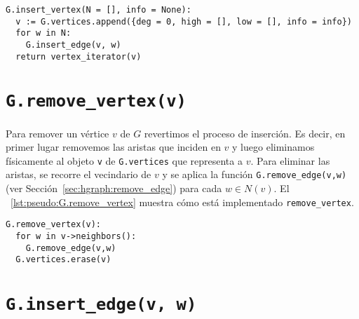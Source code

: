 \documentclass[%
    a4paper,%
    fontsize=12pt,%
    DIV=12,
    twoside,%
    openright,%
    titlepage=true,%
    headsepline,%
    toc=bibliography,%
    parskip=half,%
    cleardoublepage=empty,%
    headings=big,%
]{scrbook}
\makeatletter
\newcommand{\Code}[2][]{\lstinline[basicstyle={\ttfamily},#1]@#2@}
\makeatother
\begin{document}
\begin{lstlisting}[caption={Implementación de \Code{insert_vertex}.},float=ht,label={lst:pseudo:G.insert_vertex}]
G.insert_vertex(N = [], info = None):
  v := G.vertices.append({deg = 0, high = [], low = [], info = info})
  for w in N:
    G.insert_edge(v, w)
  return vertex_iterator(v)
\end{lstlisting}

\section{\texorpdfstring{\Code{G.remove_vertex(v)}}{G.remove\_vertex(v)}}
\label{sec:hgraph:remove_vertex}

Para remover un vértice $v$ de $G$ revertimos el proceso de inserción.  Es decir, en primer lugar removemos las aristas que inciden en $v$ y luego eliminamos físicamente al objeto \Code{v} de \Code{G.vertices} que representa a $v$.  Para eliminar las aristas, se recorre el vecindario de $v$ y se aplica la función \Code{G.remove_edge(v,w)} (ver Sección~\ref{sec:hgraph:remove_edge}) para cada $w \in N(v)$.  El \lstlistingname~\ref{lst:pseudo:G.remove_vertex} muestra cómo está implementado \Code{remove_vertex}.

\begin{lstlisting}[caption={Implementación de \Code{remove_vertex}.},float=ht,label={lst:pseudo:G.remove_vertex}]
G.remove_vertex(v):
  for w in v->neighbors():
    G.remove_edge(v,w)
  G.vertices.erase(v)
\end{lstlisting}



\section{\texorpdfstring{\Code{G.insert_edge(v, w)}}{G.insert\_edge(v, w)}}
\label{sec:hgraph:insert_edge}
\end{document}
